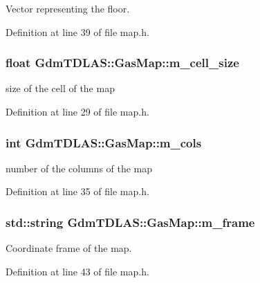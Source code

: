Vector representing the floor. 



Definition at line 39 of file map.h.

\subsubsection[{m\_\-cell\_\-size}]{\setlength{\rightskip}{0pt plus 5cm}float {\bf GdmTDLAS::GasMap::m\_\-cell\_\-size}\hspace{0.3cm}{\ttfamily  [private]}}\label{classGdmTDLAS_1_1GasMap_ab18c6c69d50c8294d762d359c19b6590}


size of the cell of the map 



Definition at line 29 of file map.h.

\subsubsection[{m\_\-cols}]{\setlength{\rightskip}{0pt plus 5cm}int {\bf GdmTDLAS::GasMap::m\_\-cols}\hspace{0.3cm}{\ttfamily  [private]}}\label{classGdmTDLAS_1_1GasMap_acfd92d4f4155edda88f1d2bc43a10be4}


number of the columns of the map 



Definition at line 35 of file map.h.

\subsubsection[{m\_\-frame}]{\setlength{\rightskip}{0pt plus 5cm}std::string {\bf GdmTDLAS::GasMap::m\_\-frame}\hspace{0.3cm}{\ttfamily  [private]}}\label{classGdmTDLAS_1_1GasMap_a366f4b965fcdcc3d6b3d2206dadfc645}


Coordinate frame of the map. 



Definition at line 43 of file map.h.


